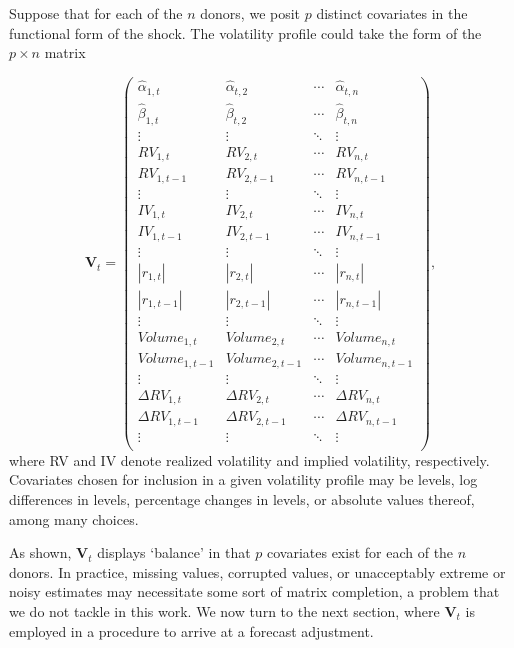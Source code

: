 \documentclass[11pt]{article}
\theoremstyle{definition}
\begin{document}
    Suppose that for each of the $n$ donors, we posit $p$ distinct covariates in the functional form of the shock.  The volatility profile could take the form of the $p \times n$ matrix 

    \begin{equation*}
      \textbf{V}_{t} = 
      \begin{pmatrix}
      \hat\alpha_{1,t} & \hat\alpha_{t,2}  & \cdots & \hat\alpha_{t,n}  \\
      \hat\beta_{1,t} & \hat\beta_{t,2}  & \cdots & \hat\beta_{t,n}  \\
      \vdots  & \vdots  & \ddots & \vdots  \\
      RV_{1,t} & RV_{2,t}  & \cdots & RV_{n,t}  \\
      RV_{1,t-1}  & RV_{2,t-1}  & \cdots & RV_{n,t-1}  \\
      \vdots  & \vdots  & \ddots & \vdots  \\
      IV_{1,t} & IV_{2,t} & \cdots & IV_{n,t} \\
      IV_{1,t-1}  & IV_{2,t-1}  & \cdots & IV_{n,t-1} \\
      \vdots  & \vdots  & \ddots & \vdots  \\
      |r_{1,t}| & |r_{2,t}| & \cdots & |r_{n,t}| \\
      |r_{1,t-1}|  & |r_{2,t-1}|  & \cdots & |r_{n,t-1}| \\
      \vdots  & \vdots  & \ddots & \vdots  \\
      Volume_{1,t}  & Volume_{2,t}  & \cdots & Volume_{n,t} \\
      Volume_{1,t-1}  & Volume_{2,t-1}  & \cdots & Volume_{n,t-1}  \\
      \vdots  & \vdots  & \ddots & \vdots  \\
      \Delta RV_{1,t} & \Delta RV_{2,t}  & \cdots & \Delta RV_{n,t}  \\
      \Delta RV_{1,t-1}  & \Delta RV_{2,t-1}  & \cdots & \Delta RV_{n,t-1}  \\
      \vdots  & \vdots  & \ddots & \vdots  \\
      \end{pmatrix},
      \end{equation*}
      where RV and IV denote realized volatility and implied volatility, respectively.  Covariates chosen for inclusion in a given volatility profile may be levels, log differences in levels, percentage changes in levels, or absolute values thereof, among many choices.

      As shown, $\textbf{V}_{t}$ displays `balance' in that $p$ covariates exist for each of the $n$ donors.  In practice, missing values, corrupted values, or unacceptably extreme or noisy estimates may necessitate some sort of matrix completion, a problem that we do not tackle in this work.  We now turn to the next section, where $\textbf{V}_{t}$ is employed in a procedure to arrive at a forecast adjustment. 
    
\end{document}
